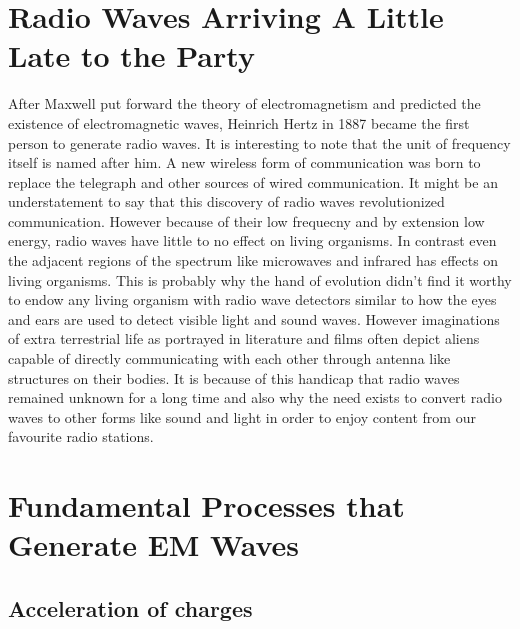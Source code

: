 \documentclass{../template/texnote}
\begin{document}
\section{Radio Waves Arriving A Little Late to the Party}
After Maxwell put forward the theory of electromagnetism and predicted the existence of electromagnetic waves, Heinrich Hertz in 1887 became the first person to generate radio waves.
It is interesting to note that the unit of frequency itself is named after him. 
A new wireless form of communication was born to replace the telegraph and other sources of wired communication. It might be an understatement to say that this discovery of radio waves revolutionized communication. 
However because of their low frequecny and by extension low energy, radio waves have little to no effect on living organisms. In contrast even the adjacent regions of the spectrum like microwaves  and infrared has effects on living organisms. 
This is probably why the hand of evolution didn't find it worthy to endow any living organism with radio wave detectors similar to how the eyes and ears are used to detect visible light and sound waves. 
However imaginations of extra terrestrial life as portrayed in literature and films often depict aliens capable of directly communicating with each other through antenna like structures on their bodies.
It is because of this handicap that radio waves remained unknown for a long time and also why the need exists to convert radio waves to other forms like sound and light in order to enjoy content from our favourite radio stations.

\section{Fundamental Processes that Generate EM Waves}
\subsection{Acceleration of charges}
\end{document}
